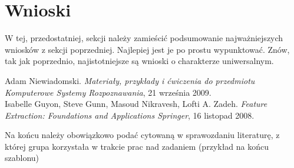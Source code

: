 \documentclass{classrep}
\begin{document}
\section{Wnioski}
{\color{blue}W tej, przedostatniej, sekcji należy zamieścić podsumowanie
najważniejszych wniosków z sekcji poprzedniej. Najlepiej jest je po prostu
wypunktować. Znów, tak jak poprzednio, najistotniejsze są wnioski o
charakterze uniwersalnym.}


\begin{thebibliography}{0}

     Adam Niewiadomski.
    \textsl{Materiały, przykłady i ćwiczenia do przedmiotu
    Komputerowe Systemy Rozpoznawania}, 21 września 2009.\\

     Isabelle Guyon, Steve Gunn, Masoud Nikravesh, Lofti A. Zadeh.
    \textsl{Feature Extraction: Foundations and Applications Springer}, 16 listopad 2008.


\end{thebibliography}
{\color{blue} 
Na końcu należy obowiązkowo podać cytowaną w sprawozdaniu
literaturę, z której grupa korzystała w trakcie prac nad zadaniem (przykład na
końcu szablonu)}
\end{document}
